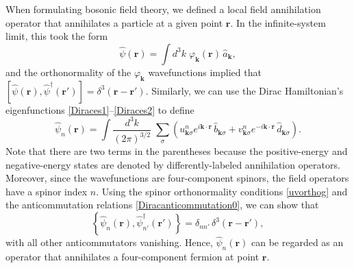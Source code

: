 \documentclass[pra,12pt]{revtex4}
\begin{document}
When formulating bosonic field theory, we defined a local field
annihilation operator that annihilates a particle at a given point
$\mathbf{r}$.  In the infinite-system limit, this took the form
\begin{equation}
  \hat{\psi}(\mathbf{r})
  = \int d^3k \; \varphi_{\mathbf{k}}(\mathbf{r}) \, \hat{a}_{\mathbf{k}},
\end{equation}
and the orthonormality of the $\varphi_{\mathbf{k}}$ wavefunctions
implied that $[\hat{\psi}(\mathbf{r}),
  \hat{\psi}^\dagger(\mathbf{r}')] =
\delta^3(\mathbf{r}-\mathbf{r}')$.  Similarly, we can use the Dirac
Hamiltonian's eigenfunctions \eqref{Diraces1}--\eqref{Diraces2} to
define
\begin{equation}
  \hat{\psi}_n(\mathbf{r})
  = \int \frac{d^3k}{(2\pi)^{3/2}} \; \sum_\sigma
  \left(
  u^n_{\mathbf{k}\sigma} e^{i\mathbf{k}\cdot\mathbf{r}} \, \hat{b}_{\mathbf{k}\sigma}
  + v^n_{\mathbf{k}\sigma} e^{-i\mathbf{k}\cdot\mathbf{r}} \, \hat{d}_{\mathbf{k}\sigma}\right).
  \label{Diracpsi0}
\end{equation}
Note that there are two terms in the parentheses because the
positive-energy and negative-energy states are denoted by
differently-labeled annihilation operators.  Moreover, since the
wavefunctions are four-component spinors, the field operators have a
spinor index $n$.  Using the spinor orthonormality conditions
\eqref{uvorthog} and the anticommutation relations
\eqref{Diracanticommutation0}, we can show that
\begin{equation}
  \left\{\hat{\psi}_n(\mathbf{r}), \hat{\psi}_{n'}^{\dagger}(\mathbf{r}')\right\}
  = \delta_{nn'}\, \delta^3(\mathbf{r}-\mathbf{r}'),
\end{equation}
with all other anticommutators vanishing.  Hence,
$\hat{\psi}_n(\mathbf{r})$ can be regarded as an operator that
annihilates a four-component fermion at point $\mathbf{r}$.
\end{document}
